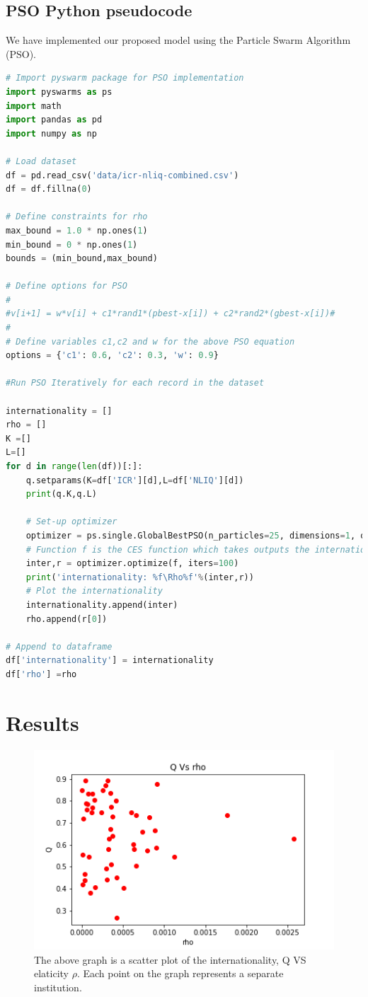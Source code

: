 \documentclass{article}
\begin{document}
\subsection{PSO Python pseudocode}
We have implemented our proposed model using the Particle Swarm Algorithm (PSO).  
\begin{lstlisting}[language=Python]
# Import pyswarm package for PSO implementation
import pyswarms as ps
import math
import pandas as pd
import numpy as np

# Load dataset
df = pd.read_csv('data/icr-nliq-combined.csv')
df = df.fillna(0)

# Define constraints for rho
max_bound = 1.0 * np.ones(1)
min_bound = 0 * np.ones(1)
bounds = (min_bound,max_bound)

# Define options for PSO
#
#v[i+1] = w*v[i] + c1*rand1*(pbest-x[i]) + c2*rand2*(gbest-x[i])#
#
# Define variables c1,c2 and w for the above PSO equation
options = {'c1': 0.6, 'c2': 0.3, 'w': 0.9}

#Run PSO Iteratively for each record in the dataset 

internationality = []
rho = []
K =[]
L=[]
for d in range(len(df))[:]:
    q.setparams(K=df['ICR'][d],L=df['NLIQ'][d])
    print(q.K,q.L)

    # Set-up optimizer
    optimizer = ps.single.GlobalBestPSO(n_particles=25, dimensions=1, options=options,bounds =bounds)
    # Function f is the CES function which takes outputs the internationality score Q. 
    inter,r = optimizer.optimize(f, iters=100)
    print('internationality: %f\Rho%f'%(inter,r))
    # Plot the internationality
    internationality.append(inter)
    rho.append(r[0])

# Append to dataframe
df['internationality'] = internationality
df['rho'] =rho
\end{lstlisting}

\newpage
\section{Results}
\begin{figure}[h]
    \centering
    \includegraphics[scale=0.4]{images/qVSrho.png}
    \caption{The above graph is a scatter plot of the internationality, Q VS elaticity $\rho$. Each point on the graph represents a separate institution.}
    \label{fig:my_label}
\end{figure}
\end{document}

